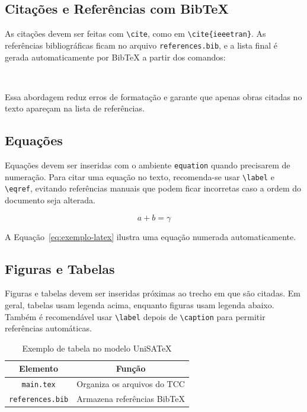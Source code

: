 \subsection{Citações e Referências com BibTeX}
As citações devem ser feitas com \verb|\cite|, como em \verb|\cite{ieeetran}|. As referências bibliográficas ficam no arquivo \texttt{references.bib}, e a lista final é gerada automaticamente por BibTeX a partir dos comandos:

\begin{verbatim}


\end{verbatim}

Essa abordagem reduz erros de formatação e garante que apenas obras citadas no texto apareçam na lista de referências.

\subsection{Equações}
Equações devem ser inseridas com o ambiente \verb|equation| quando precisarem de numeração. Para citar uma equação no texto, recomenda-se usar \verb|\label| e \verb|\eqref|, evitando referências manuais que podem ficar incorretas caso a ordem do documento seja alterada.

\begin{equation}
a + b = \gamma\label{eq:exemplo-latex}
\end{equation}

A Equação~\eqref{eq:exemplo-latex} ilustra uma equação numerada automaticamente.

\subsection{Figuras e Tabelas}
Figuras e tabelas devem ser inseridas próximas ao trecho em que são citadas. Em geral, tabelas usam legenda acima, enquanto figuras usam legenda abaixo. Também é recomendável usar \verb|\label| depois de \verb|\caption| para permitir referências automáticas.

\begin{table}[htbp]
\caption{Exemplo de tabela no modelo UniSATeX}
\begin{center}
\begin{tabular}{|c|c|}
\hline
\textbf{Elemento} & \textbf{Função} \\
\hline
\texttt{main.tex} & Organiza os arquivos do TCC \\
\hline
\texttt{references.bib} & Armazena referências BibTeX \\
\hline
\end{tabular}
\label{tab:exemplo-latex}
\end{center}
\end{table}

